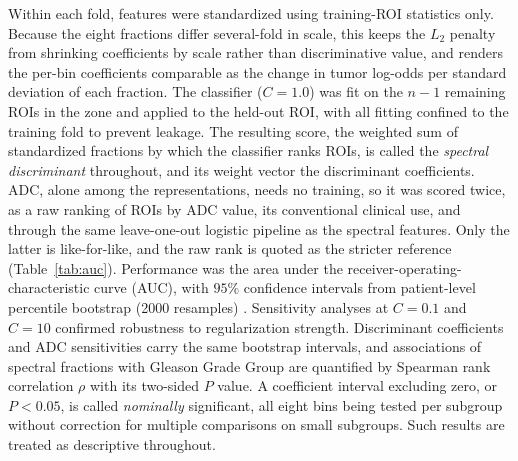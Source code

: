 Within each fold, features were standardized using training-ROI statistics only. Because the eight fractions differ several-fold in scale, this keeps the $L_2$ penalty from shrinking coefficients by scale rather than discriminative value, and renders the per-bin coefficients comparable as the change in tumor log-odds per standard deviation of each fraction.
The classifier ($C = 1.0$) was fit on the $n - 1$ remaining ROIs in the zone and applied to the held-out ROI, with all fitting confined to the training fold to prevent leakage.
The resulting score, the weighted sum of standardized fractions by which the classifier ranks ROIs, is called the \emph{spectral discriminant} throughout, and its weight vector the discriminant coefficients.
ADC, alone among the representations, needs no training, so it was scored twice, as a raw ranking of ROIs by ADC value, its conventional clinical use, and through the same leave-one-out logistic pipeline as the spectral features. Only the latter is like-for-like, and the raw rank is quoted as the stricter reference (Table~\ref{tab:auc}).
Performance was the area under the receiver-operating-characteristic curve (AUC), with $95\%$ confidence intervals from patient-level percentile bootstrap (2000 resamples) \citep{efron1993bootstrap}. Sensitivity analyses at $C = 0.1$ and $C = 10$ confirmed robustness to regularization strength.
Discriminant coefficients and ADC sensitivities carry the same bootstrap intervals, and associations of spectral fractions with Gleason Grade Group are quantified by Spearman rank correlation $\rho$ with its two-sided $P$ value. A coefficient interval excluding zero, or $P < 0.05$, is called \emph{nominally} significant, all eight bins being tested per subgroup without correction for multiple comparisons on small subgroups. Such results are treated as descriptive throughout.

